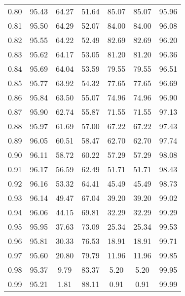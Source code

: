 \begin{tabular}{|c|c|c|c|c|c|c|}
      0.80 &     95.43 &     64.27 &      51.64 &   85.07 &      85.07 &         95.96 \\
      0.81 &     95.50 &     64.29 &      52.07 &   84.00 &      84.00 &         96.08 \\
      0.82 &     95.55 &     64.22 &      52.49 &   82.69 &      82.69 &         96.20 \\
      0.83 &     95.62 &     64.17 &      53.05 &   81.20 &      81.20 &         96.36 \\
      0.84 &     95.69 &     64.04 &      53.59 &   79.55 &      79.55 &         96.51 \\
      0.85 &     95.77 &     63.92 &      54.32 &   77.65 &      77.65 &         96.69 \\
      0.86 &     95.84 &     63.50 &      55.07 &   74.96 &      74.96 &         96.90 \\
      0.87 &     95.90 &     62.74 &      55.87 &   71.55 &      71.55 &         97.13 \\
      0.88 &     95.97 &     61.69 &      57.00 &   67.22 &      67.22 &         97.43 \\
      0.89 &     96.05 &     60.51 &      58.47 &   62.70 &      62.70 &         97.74 \\
      0.90 &     96.11 &     58.72 &      60.22 &   57.29 &      57.29 &         98.08 \\
      0.91 &     96.17 &     56.59 &      62.49 &   51.71 &      51.71 &         98.43 \\
      0.92 &     96.16 &     53.32 &      64.41 &   45.49 &      45.49 &         98.73 \\
      0.93 &     96.14 &     49.47 &      67.04 &   39.20 &      39.20 &         99.02 \\
      0.94 &     96.06 &     44.15 &      69.81 &   32.29 &      32.29 &         99.29 \\
      0.95 &     95.95 &     37.63 &      73.09 &   25.34 &      25.34 &         99.53 \\
      0.96 &     95.81 &     30.33 &      76.53 &   18.91 &      18.91 &         99.71 \\
      0.97 &     95.60 &     20.80 &      79.79 &   11.96 &      11.96 &         99.85 \\
      0.98 &     95.37 &      9.79 &      83.37 &    5.20 &       5.20 &         99.95 \\
      0.99 &     95.21 &      1.81 &      88.11 &    0.91 &       0.91 &         99.99 \\
\bottomrule
\end{tabular}
